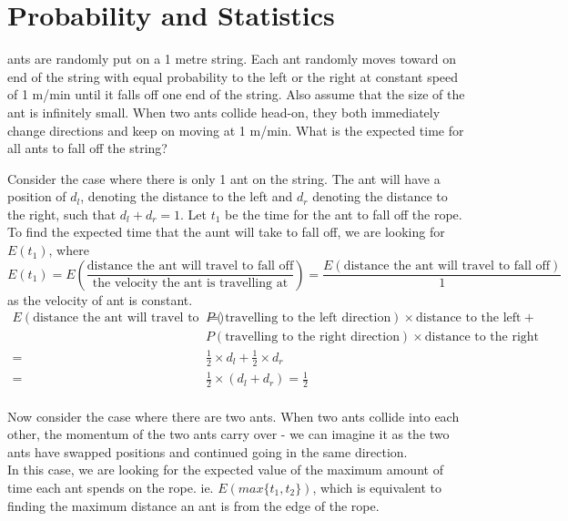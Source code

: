 \documentclass[answers]{exam}
\begin{document}
\section{Probability and Statistics}
\begin{questions}
    
 ants are randomly put on a 1 metre string. 
Each ant randomly moves toward on end of the string with equal 
probability to the left or the right at constant speed of 1 m/min 
until it falls off one end of the string. 
Also assume that the size of the ant is infinitely small. 
When two ants collide head-on, they both immediately change directions 
and keep on moving at 1 m/min. 
What is the expected time for all ants to fall off the string?

\begin{solution}
    Consider the case where there is only 1 ant on the string. The ant will 
have a position of $d_l$, denoting the distance to the left and $d_r$ denoting 
the distance to the right, such that $d_l+d_r = 1$.\newline 
Let $t_1$ be the time for the ant to fall off the rope. To find
 the expected time that the aunt will take to fall off, 
 we are
looking for $E(t_1)$, where
$$E(t_1) = E(\frac{\text{distance the ant will travel to fall off}}{\text{the velocity the ant is travelling at}})=\frac{E(\text{distance the ant will travel to fall off})}{1}$$
as the velocity of ant is constant. 
\begin{align*}
    E(\text{distance the ant will travel to fall off})=&
    P(\text{travelling to the left direction})\times
    \text{distance to the left}+\\
    &P(\text{travelling to the right direction})\times
    \text{distance to the right}\\
    =&\frac{1}{2}\times d_l + \frac{1}{2} \times d_r\\
    =&\frac{1}{2}\times (d_l+d_r)
    =\frac{1}{2}
\end{align*}
\\
Now consider the case where there are two ants. When two ants collide into each other,
the momentum of the two ants carry over - we can imagine it as the two ants have swapped positions and
continued going in the same direction.\\
In this case, we are looking for the expected value of the maximum amount of time each ant spends on the rope.
ie. $E(max\{t_1, t_2\})$, which is equivalent to finding the maximum distance an ant is from the edge of the rope.\\

\end{solution}
\end{questions}
\end{document}
